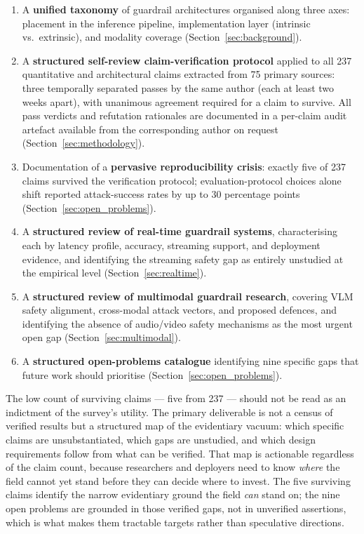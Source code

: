 \begin{enumerate}
  \item A \textbf{unified taxonomy} of guardrail architectures organised along three axes:
        placement in the inference pipeline, implementation layer (intrinsic vs.\ extrinsic),
        and modality coverage (Section~\ref{sec:background}).

  \item A \textbf{structured self-review claim-verification protocol} applied to all 237
        quantitative and architectural claims extracted from 75 primary sources: three
        temporally separated passes by the same author (each at least two weeks apart),
        with unanimous agreement required for a claim to survive.
        All pass verdicts and refutation rationales are documented in a per-claim
        audit artefact available from the corresponding author on request
        (Section~\ref{sec:methodology}).

  \item Documentation of a \textbf{pervasive reproducibility crisis}: exactly five of
        237 claims survived the verification protocol; evaluation-protocol choices alone
        shift reported attack-success rates by up to 30 percentage
        points~\cite{li2024salad} (Section~\ref{sec:open_problems}).

  \item A \textbf{structured review of real-time guardrail systems}, characterising each
        by latency profile, accuracy, streaming support, and deployment evidence, and
        identifying the streaming safety gap as entirely unstudied at the empirical level
        (Section~\ref{sec:realtime}).

  \item A \textbf{structured review of multimodal guardrail research}, covering VLM safety
        alignment, cross-modal attack vectors, and proposed defences, and identifying the
        absence of audio/video safety mechanisms as the most urgent open gap
        (Section~\ref{sec:multimodal}).

  \item A \textbf{structured open-problems catalogue} identifying nine specific gaps
        that future work should prioritise (Section~\ref{sec:open_problems}).
\end{enumerate}

\noindent The low count of surviving claims — five from 237 — should not be read as
an indictment of the survey's utility.
The primary deliverable is not a census of verified results but a structured map of
the evidentiary vacuum: which specific claims are unsubstantiated, which gaps are
unstudied, and which design requirements follow from what can be verified.
That map is actionable regardless of the claim count, because researchers and
deployers need to know \emph{where} the field cannot yet stand before they can
decide where to invest.
The five surviving claims identify the narrow evidentiary ground the field \emph{can}
stand on; the nine open problems are grounded in those verified gaps, not in
unverified assertions, which is what makes them tractable targets rather than
speculative directions.

